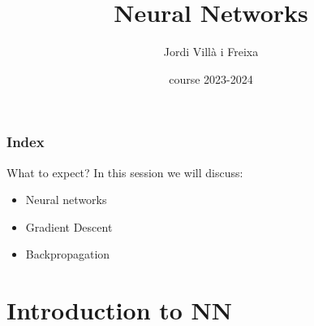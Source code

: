 \documentclass{beamer}
\title[Neural Networks]{Neural Networks} %
\author{Jordi Villà i Freixa} %
\institute[FCTE] %
{
Universitat de Vic - Universitat Central de Catalunya \\
Study Abroad\\ %
\medskip
\textit{jordi.villa@uvic.cat} %
}
\date{course 2023-2024}
\begin{document}
\begin{frame}
\titlepage %
\end{frame}

\begin{frame}
\frametitle{Index} %
\tableofcontents %
\end{frame}



\begin{frame}{What to expect?}
  In this session we will discuss:
  \begin{itemize}
    \item Neural networks
    \item Gradient Descent
    \item Backpropagation
  \end{itemize}
\end{frame}

\section{Introduction to NN}
\end{document}
